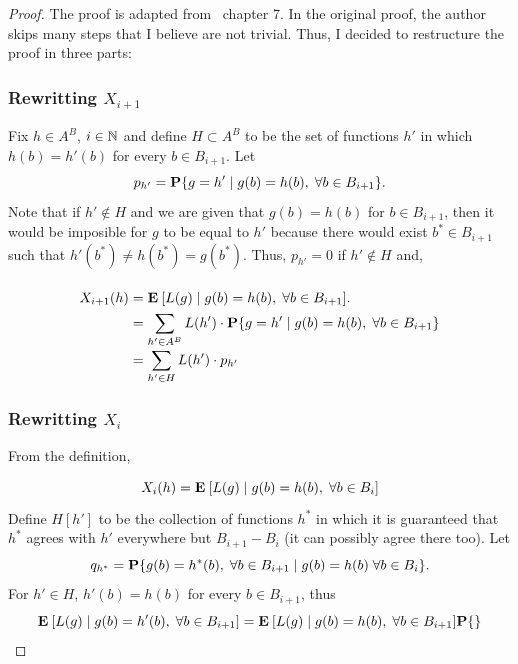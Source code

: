 \begin{proof} The proof is adapted from~\cite{alon2016probabilistic} chapter 7. In the original proof, the author skips many steps that I believe are not trivial. Thus, I decided to restructure the proof in three parts:

\subsubsection*{Rewritting $X_{i+1}$}
Fix $h \in A^B$, $i\in \N$ and define $H\subset A^B$ to be the set of functions $h'$ in which $h(b) = h'(b)$ for every $b \in B_{i+1}$. Let
\[ p_{h'} = \P\{g = h' \;|\; g(b) = h(b),\; \forall b \in B_{i+1}\}. \]
Note that if $h' \not\in H$ and we are given that $g(b) = h(b)$ for $b\in B_{i+1}$, then it would be imposible for $g$ to be equal to $h'$ because there would exist $b^* \in B_{i+1}$ such that $h'(b^*) \neq h(b^*) = g(b^*)$. Thus, $p_{h'} = 0$ if $h' \not\in H$ and,

\[\everymath{\displaystyle}\arraycolsep=1.4pt\def\arraystretch{1.5}
    \begin{array}{rcl}
    X_{i+1}(h) & = & \E[ L(g) \;|\; g(b) = h(b),\; \forall b\in B_{i+1} ]. \\ 
    & = & \sum_{h' \in A^B} L(h') \cdot \P\{g = h' \;|\; g(b) = h(b),\; \forall b \in B_{i+1}\}\\
    & = & \sum_{h' \in H} L(h') \cdot p_{h'}
\end{array}\]

\subsubsection*{Rewritting $X_i$}
From the definition,
\[\everymath{\displaystyle}\arraycolsep=1.4pt\def\arraystretch{1.5}
    \begin{array}{rcl}
    X_{i}(h) & = & \E[L(g) \;|\; g(b) = h(b),\; \forall b\in B_{i}]
\end{array}\]
Define $H[h']$ to be the collection of functions $h^*$ in which it is guaranteed that $h^*$ agrees with $h'$ everywhere but $B_{i+1}-B_i$ (it can possibly agree there too). Let
\[q_{h^*} = \P\{g(b) = h^*(b),\; \forall b \in B_{i+1} \;|\; g(b) = h(b) \; \forall b \in B_{i} \}. \]
For $h' \in H$, $h'(b) = h(b)$ for every $b \in B_{i+1}$, thus
\[ \E[ L(g) \;|\; g(b) = h'(b),\; \forall b\in B_{i+1} ] = \E[ L(g) \;|\; g(b) = h(b),\; \forall b\in B_{i+1} ] \P\{\}\] 

\end{proof}

